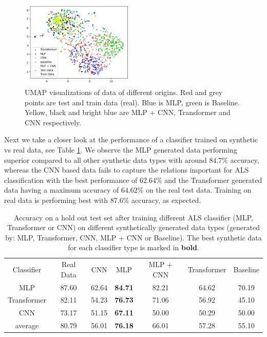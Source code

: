 \begin{figure}
  \centering
  \includegraphics[width = 0.48\textwidth]{figures/umap.png}
  \caption{UMAP visualizations of data of different origins. Red and grey points are test and train data (real). Blue is MLP, green is Baseline. Yellow, black and bright blue are MLP + CNN, Transformer and CNN respectively.}
  \label{fig:umap}
\end{figure}
Next we take a closer look at the performance of a classifier trained on synthetic vs real data, see Table \ref{Fig:cls}. We observe the MLP generated data performing superior compared to all other synthetic data types with around $84.7\%$ accuracy, whereas the CNN based data fails to capture the relations important for ALS classification with the best performance of $62.64\%$ and the Transformer generated data having a maximum accuracy of $64.62\%$ on the real test data.
Training on real data is performing best with $87.6\%$ accuracy, as expected.


\begin{table}
  \centering
  \caption{Accuracy on a hold out test set after training different ALS classifier (MLP, Transformer or CNN)  on different synthetically generated data types (generated by: MLP, Transformer, CNN, MLP + CNN or Baseline). The best synthetic data for each classifier type is marked in \textbf{bold}.}
  \label{Fig:cls}
  \begin{tabular}{c|cccccc}
    \toprule
Classifier & Real Data  & CNN  & MLP  & MLP + CNN & Transformer & Baseline \\
 
   \cmidrule(r){1-7} 
MLP &  87.60 & 62.64 & \textbf{84.71} & 82.21 & 64.62 & 70.19 \\
Transformer & 82.11  & 54.23 &  \textbf{76.73} & 71.06 & 56.92 & 45.10 \\
CNN &  73.17 & 51.15 & \textbf{67.11} & 50.00 & 50.29 & 50.00 \\
\cmidrule(r){1-7} 
average & 80.79 & 56.01 & \textbf{76.18} & 66.01 & 57.28 & 55.10\\
    \bottomrule
  \end{tabular}
\end{table}



